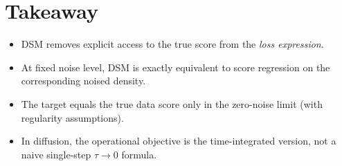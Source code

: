 \documentclass[11pt]{article}
\begin{document}
\section{Takeaway}
\begin{itemize}
\item DSM removes explicit access to the true score from the \emph{loss expression}.
\item At fixed noise level, DSM is exactly equivalent to score regression on the corresponding noised density.
\item The target equals the true data score only in the zero-noise limit (with regularity assumptions).
\item In diffusion, the operational objective is the time-integrated version, not a naive single-step $\tau\to0$ formula.
\end{itemize}
\end{document}
